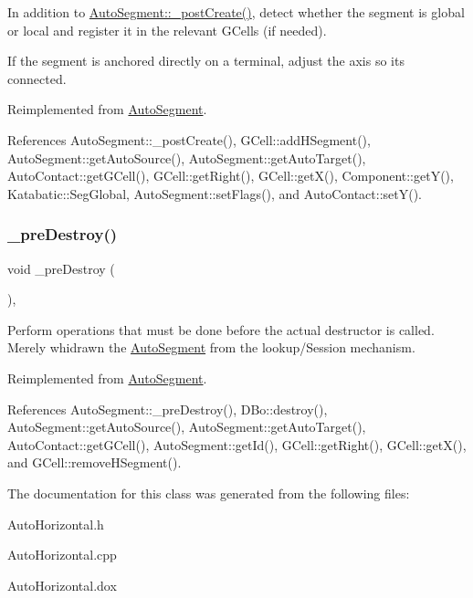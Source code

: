 In addition to \hyperlink{classKatabatic_1_1AutoSegment_a3715b38135ca24745f610bebd3407c10}{Auto\+Segment\+::\+\_\+post\+Create()}, detect whether the segment is global or local and register it in the relevant G\+Cells (if needed).

If the segment is anchored directly on a terminal, adjust the axis so it\textquotesingle{}s connected. 

Reimplemented from \hyperlink{classKatabatic_1_1AutoSegment_a3715b38135ca24745f610bebd3407c10}{Auto\+Segment}.



References Auto\+Segment\+::\+\_\+post\+Create(), G\+Cell\+::add\+H\+Segment(), Auto\+Segment\+::get\+Auto\+Source(), Auto\+Segment\+::get\+Auto\+Target(), Auto\+Contact\+::get\+G\+Cell(), G\+Cell\+::get\+Right(), G\+Cell\+::get\+X(), Component\+::get\+Y(), Katabatic\+::\+Seg\+Global, Auto\+Segment\+::set\+Flags(), and Auto\+Contact\+::set\+Y().

\mbox{\label{classKatabatic_1_1AutoHorizontal_a7c13d9795eafd477994961f8a0d962d0}} 
\subsubsection{\texorpdfstring{\+\_\+pre\+Destroy()}{\_preDestroy()}}
{\footnotesize\ttfamily void \+\_\+pre\+Destroy (\begin{DoxyParamCaption}{ }\end{DoxyParamCaption})\hspace{0.3cm}{\ttfamily [protected]}, {\ttfamily [virtual]}}

Perform operations that must be done before the actual destructor is called. Merely whidrawn the \hyperlink{classKatabatic_1_1AutoSegment}{Auto\+Segment} from the lookup/\+Session mechanism. 

Reimplemented from \hyperlink{classKatabatic_1_1AutoSegment_a7c13d9795eafd477994961f8a0d962d0}{Auto\+Segment}.



References Auto\+Segment\+::\+\_\+pre\+Destroy(), D\+Bo\+::destroy(), Auto\+Segment\+::get\+Auto\+Source(), Auto\+Segment\+::get\+Auto\+Target(), Auto\+Contact\+::get\+G\+Cell(), Auto\+Segment\+::get\+Id(), G\+Cell\+::get\+Right(), G\+Cell\+::get\+X(), and G\+Cell\+::remove\+H\+Segment().



The documentation for this class was generated from the following files\+:\begin{DoxyCompactItemize}
\item 
Auto\+Horizontal.\+h\item 
Auto\+Horizontal.\+cpp\item 
Auto\+Horizontal.\+dox\end{DoxyCompactItemize}
